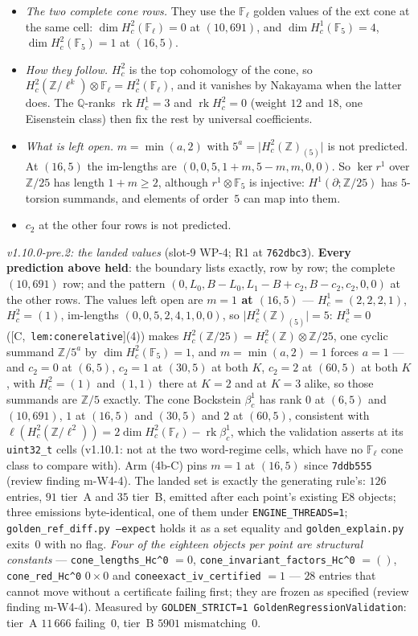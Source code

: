 \documentclass[11pt]{article}
\theoremstyle{remark}
\newcommand{\F}{\mathbb{F}}
\newcommand{\Z}{\mathbb{Z}}
\newcommand{\Q}{\mathbb{Q}}
\newcommand{\Fl}{\F_\ell}
\newcommand{\HA}[1]{[C,~\texttt{#1}]}      %
\begin{document}
\begin{itemize}
\item \emph{The two complete cone rows.} They use the $\Fl$ golden values of the ext cone at the same
  cell: $\dim H^2_c(\Fl)=0$ at $(10,691)$, and $\dim H^1_c(\F_5)=4$, $\dim H^2_c(\F_5)=1$ at
  $(16,5)$.
\item \emph{How they follow.} $H^2_c$ is the top cohomology of the cone, so
  $H^2_c(\Z/\ell^k)\otimes\Fl=H^2_c(\Fl)$, and it vanishes by Nakayama when the latter does. The
  $\Q$-ranks $\operatorname{rk}H^1_c=3$ and $\operatorname{rk}H^2_c=0$ (weight $12$ and $18$, one
  Eisenstein class) then fix the rest by universal coefficients.
\item \emph{What is left open.} $m=\min(a,2)$ with $5^a=\lvert H^2_c(\Z)_{(5)}\rvert$ is not
  predicted. At $(16,5)$ the im-lengths are $(0,0,5,1+m,5-m,m,0,0)$. So $\ker r^1$ over $\Z/25$
  has length $1+m\ge2$, although $r^1\otimes\F_5$ is injective: $H^1(\partial;\Z/25)$ has
  $5$-torsion summands, and elements of order~$5$ can map into them.
\item $c_2$ at the other four rows is not predicted.
\end{itemize}
\emph{v1.10.0-pre.2: the landed values} (slot-9 WP-4; R1 at \texttt{762dbc3}). \textbf{Every
prediction above held}: the boundary lists exactly, row by row; the complete $(10,691)$ row; and
the pattern $(0,L_0,B-L_0,L_1-B+c_2,B-c_2,c_2,0,0)$ at the other rows. The values left open are
\textbf{$m=1$ at $(16,5)$} --- $H^1_c=(2,2,2,1)$, $H^2_c=(1)$, im-lengths $(0,0,5,2,4,1,0,0)$, so
$\lvert H^2_c(\Z)_{(5)}\rvert=5$: $H^3_c=0$ (\HA{lem:conerelative}(4)) makes $H^2_c(\Z/25)=H^2_c(\Z)
\otimes\Z/25$, one cyclic summand $\Z/5^a$ by $\dim H^2_c(\F_5)=1$, and $m=\min(a,2)=1$ forces
$a=1$ --- and $c_2=0$ at $(6,5)$, $c_2=1$ at $(30,5)$ at both $K$, $c_2=2$ at $(60,5)$ at both
$K$, with $H^2_c=(1)$ and $(1,1)$ there at $K=2$ and at $K=3$ alike, so those summands are
$\Z/5$ exactly. The cone Bockstein $\beta^1_c$ has rank $0$ at $(6,5)$ and $(10,691)$, $1$ at
$(16,5)$ and $(30,5)$ and $2$ at $(60,5)$, consistent with
$\ell(H^2_c(\Z/\ell^2))=2\dim H^2_c(\Fl)-\operatorname{rk}\beta^1_c$, which the validation asserts
at its \texttt{uint32\_t} cells (v1.10.1: not at the two word-regime cells, which have no $\Fl$
cone class to compare with).
Arm (4b-C) pins $m=1$ at $(16,5)$ since \texttt{7ddb555} (review finding m-W4-4). The landed set is
exactly the generating rule's: $126$ entries, $91$ tier~A and $35$ tier~B, emitted after each
point's existing E8 objects; three emissions byte-identical, one of them under
\texttt{ENGINE\_THREADS=1}; \texttt{golden\_ref\_diff.py --expect} holds it as a set equality and
\texttt{golden\_explain.py} exits~$0$ with no flag. \emph{Four of the eighteen objects per point
are structural constants} --- \texttt{cone\_lengths\_Hc\textasciicircum0} $=0$,
\texttt{cone\_invariant\_factors\_Hc\textasciicircum0} $=()$, \texttt{cone\_red\_Hc\textasciicircum0}
$0\times0$ and \texttt{coneexact\_iv\_certified} $=1$ --- $28$ entries that cannot move without a
certificate failing first; they are frozen as specified (review finding m-W4-4). Measured by
\texttt{GOLDEN\_STRICT=1 GoldenRegressionValidation}: tier~A $11\,666$ failing~$0$, tier~B $5901$
mismatching~$0$.
\end{document}

